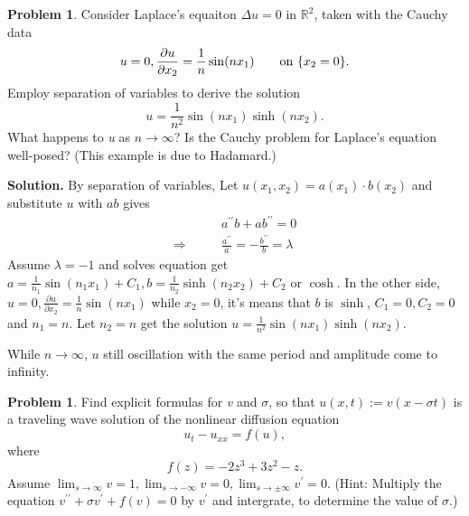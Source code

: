 \documentclass[a4paper]{book}
\newenvironment{solution}%
{\noindent\textbf{Solution.}}%
{\qedhere}
\numberwithin{equation}{chapter}
\theoremstyle{definition}
\newtheorem{pro}[exm]{Problem}
\begin{document}
\begin{pro}
  Consider Laplace's equaiton $\Delta u = 0$ in $\mathbb{R}^2$, taken with the Cauchy data
  \[u = 0, \frac{\partial u }{\partial x_2} = \frac{1}{n} \sin(n x_1) \qquad \textmd{on } \{x_2 = 0\}.\]
  Employ separation of variables to derive the solution
  \[u = \frac{1}{n^2}\sin(n x_1)\sinh(n x_2).\]
  What happens to \textit{u} as $n \rightarrow \infty$? Is the Cauchy problem for Laplace's equation well-posed? (This example is due to Hadamard.)
\end{pro}

\begin{solution}
  By separation of variables, Let $u(x_1,x_2) = a(x_1) \cdot b(x_2)$ and substitute $u$ with $ab$ gives
  \begin{align*}
    &a^{\prime\prime}b + a b^{\prime \prime} = 0 \\
    \Longrightarrow\qquad & \frac{a^{\prime\prime}}{a} = - \frac{b^{\prime\prime}}{b} = \lambda
  \end{align*}
  Assume $\lambda = -1$ and solves equation get $a = \frac{1}{n_1}\sin(n_1x_1) + C_1, b = \frac{1}{n_2}\sinh(n_2x_2) + C_2$ or $\cosh$. In the other side, $u = 0,\frac{\partial u }{\partial x_2} = \frac{1}{n} \sin(n x_1)$ while $x_2 = 0$, it's means that $b$ is $\sinh$, $C_1 = 0, C_2 = 0$ and $n_1 = n$. Let $n_2 = n$ get the solution $u = \frac{1}{n^2}\sin(n x_1)\sinh(n x_2)$.

  While $n\rightarrow \infty$, $u$ still oscillation with the same period and amplitude come to infinity.
\end{solution}

\begin{pro}
  Find explicit formulas for \textit{v} and $\sigma$, so that $u(x,t) := v(x - \sigma t)$ is a traveling wave solution of the nonlinear diffusion equation
  \[u_t - u_{xx} = f(u),\]
  where
  \[f(z) = -2z^3 + 3z^2 - z.\]
  Assume $\lim_{s \rightarrow \infty} v = 1, \lim_{s \rightarrow - \infty} v = 0, \lim_{s \rightarrow \pm \infty} v^\prime = 0$.
  (Hint: Multiply the equation $v^{\prime \prime} + \sigma v^\prime + f(v) = 0$ by $v^\prime$ and intergrate, to determine the value of $\sigma$.)
\end{pro}
\end{document}
